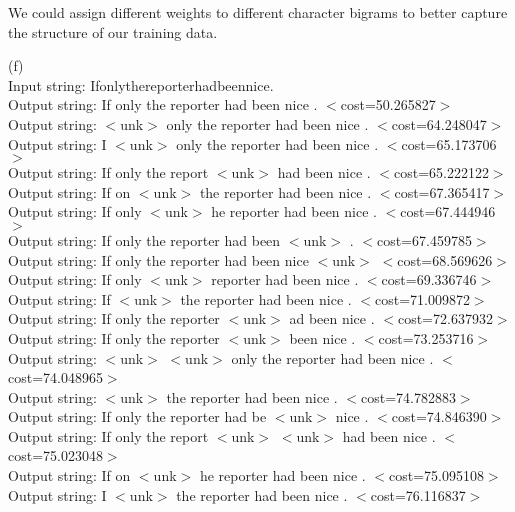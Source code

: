 \documentclass[11pt]{article} %
\begin{document}
We could assign different weights to different character bigrams to better capture the structure of our training data.\\

\newpage

(f)\\

Input string: Ifonlythereporterhadbeennice.\\
Output string: If only the reporter had been nice . $<$cost=50.265827$>$\\
Output string: $<$unk$>$ only the reporter had been nice . $<$cost=64.248047$>$\\
Output string: I $<$unk$>$ only the reporter had been nice . $<$cost=65.173706$>$\\
Output string: If only the report $<$unk$>$ had been nice . $<$cost=65.222122$>$\\
Output string: If on $<$unk$>$ the reporter had been nice . $<$cost=67.365417$>$\\
Output string: If only $<$unk$>$ he reporter had been nice . $<$cost=67.444946$>$\\
Output string: If only the reporter had been $<$unk$>$ . $<$cost=67.459785$>$\\
Output string: If only the reporter had been nice $<$unk$>$ $<$cost=68.569626$>$\\
Output string: If only $<$unk$>$ reporter had been nice . $<$cost=69.336746$>$\\
Output string: If $<$unk$>$ the reporter had been nice . $<$cost=71.009872$>$\\
Output string: If only the reporter $<$unk$>$ ad been nice . $<$cost=72.637932$>$\\
Output string: If only the reporter $<$unk$>$ been nice . $<$cost=73.253716$>$\\
Output string: $<$unk$>$ $<$unk$>$ only the reporter had been nice . $<$cost=74.048965$>$\\
Output string: $<$unk$>$ the reporter had been nice . $<$cost=74.782883$>$\\
Output string: If only the reporter had be $<$unk$>$ nice . $<$cost=74.846390$>$\\
Output string: If only the report $<$unk$>$ $<$unk$>$ had been nice . $<$cost=75.023048$>$\\
Output string: If on $<$unk$>$ he reporter had been nice . $<$cost=75.095108$>$\\
Output string: I $<$unk$>$ the reporter had been nice . $<$cost=76.116837$>$\\
\end{document}
